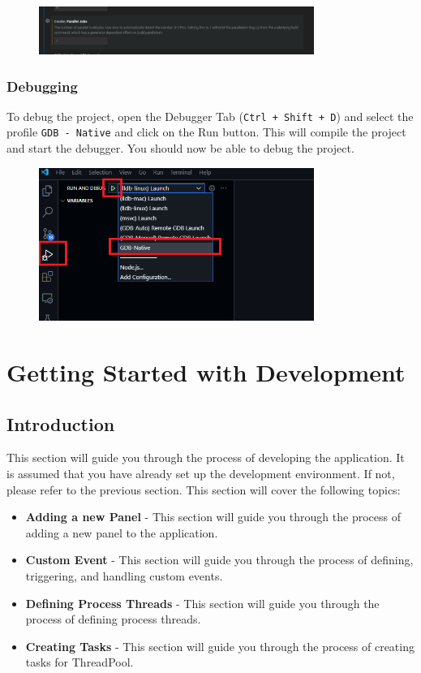 \begin{figure}[H]
      \centering
      \includegraphics[width=0.8\textwidth]{texs/chapter1/image/cppbuild3.png}
\end{figure}

\section{Debugging}

To debug the project, open the Debugger Tab (\texttt{Ctrl + Shift + D}) and select the profile \texttt{GDB - Native} and click on the Run button. This will compile the project and start the debugger. You should now be able to debug the project.

\begin{figure}[H]
      \centering
      \includegraphics[width=0.8\textwidth]{texs/chapter1/image/debug2.png}
\end{figure}

\part{Getting Started with Development}

\chapter{Introduction}

This section will guide you through the process of developing the application. It is assumed that you have already set up the development environment. If not, please refer to the previous section. This section will cover the following topics:

\begin{itemize}
      \item \textbf{Adding a new Panel} - This section will guide you through the process of adding a new panel to the application.
      \item \textbf{Custom Event} - This section will guide you through the process of defining, triggering, and handling custom events.
      \item \textbf{Defining Process Threads} - This section will guide you through the process of defining process threads.
      \item \textbf{Creating Tasks} - This section will guide you through the process of creating tasks for ThreadPool.
\end{itemize}

